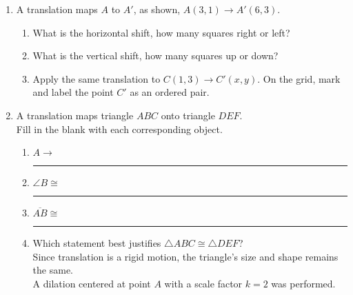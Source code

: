 \begin{enumerate}
\item A translation maps $A$ to $A'$, as shown, $A(3,1) \rightarrow A'(6,3)$.
\begin{multicols}{2}
  \begin{enumerate}
    \item What is the horizontal shift, how many squares right or left? \vspace{1.25cm}
    \item What is the vertical shift, how many squares up or down? \vspace{1.25cm}
    \item Apply the same translation to $C(1,3)\rightarrow C'(x,y)$. On the grid, mark and label the point $C'$ as an ordered pair.
    \end{enumerate}
    \begin{flushright}
    \end{flushright}
\end{multicols}

\item A translation maps triangle $ABC$ onto triangle $DEF$. \\[0.5cm]
Fill in the blank with each corresponding object. \vspace{0.5cm}
  \begin{multicols}{2}

    \begin{enumerate}
      \item $A \rightarrow$ \rule{2cm}{0.15mm}
      \item $\angle B \cong$ \rule{2cm}{0.15mm}
      \item $\overline {AB} \cong$ \rule{2cm}{0.15mm}
      \item Which statement best justifies $\triangle ABC \cong \triangle DEF$? \\[0.5cm]
      Since translation is a rigid motion, the triangle's size and shape remains the same.\\[0.5cm]
      A dilation centered at point $A$ with a scale factor $k=2$ was performed.
    \end{enumerate}
  \end{multicols}


\end{enumerate}
